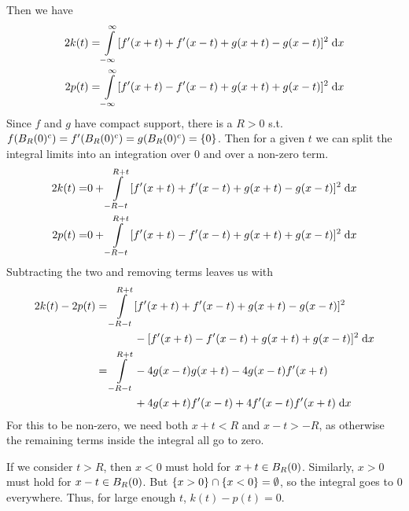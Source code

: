 Then we have
\begin{align*}
  2 k(t) = &\int \limits_{-\infty}^{\infty} [f'(x + t) + f'(x - t) + g(x + t) - g(x - t)]^2 \dx\\
  2 p(t) = &\int \limits_{-\infty}^{\infty} [f'(x + t) - f'(x - t) + g(x + t) + g(x - t)]^2 \dx
\end{align*}
Since $f$ and $g$ have compact support, there is a $R > 0$ s.t. $f(\ball{0}{R}^c) = f'(\ball{0}{R}^c) = g(\ball{0}{R}^c) = \set{0}$.
Then for a given $t$ we can split the integral limits into an integration over $0$ and over a non-zero term.
\begin{align*}
  2 k(t) = &0 + \int \limits_{-R - t}^{R + t} [f'(x + t) + f'(x - t) + g(x + t) - g(x - t)]^2 \dx\\
  2 p(t) = &0 + \int \limits_{-R - t}^{R + t} [f'(x + t) - f'(x - t) + g(x + t) + g(x - t)]^2 \dx
\end{align*}
Subtracting the two and removing terms leaves us with
\begin{align*}
  2 k(t) - 2 p(t) = \int \limits_{-R - t}^{R + t} &[f'(x + t) + f'(x - t) + g(x + t) - g(x - t)]^2\\
                                              &- [f'(x + t) - f'(x - t) + g(x + t) + g(x - t)]^2 \dx\\
                  = \int \limits_{-R - t}^{R + t} &-4 g(x - t) g(x + t) - 4 g(x - t) f'(x + t)\\
                                              &+ 4 g(x + t) f'(x - t) + 4 f'(x - t) f'(x + t) \dx
\end{align*}
For this to be non-zero, we need both $x + t < R$ and $x - t > -R$,
as otherwise the remaining terms inside the integral all go to zero.

If we consider $t > R$, then $x < 0$ must hold for $x + t \in \ball{0}{R}$.
Similarly, $x > 0$ must hold for $x - t \in \ball{0}{R}$.
But $\set{x > 0} \cap \set{x < 0} = \emptyset$, so the integral goes to $0$ everywhere.
Thus, for large enough $t$, $k(t) - p(t) = 0$.


